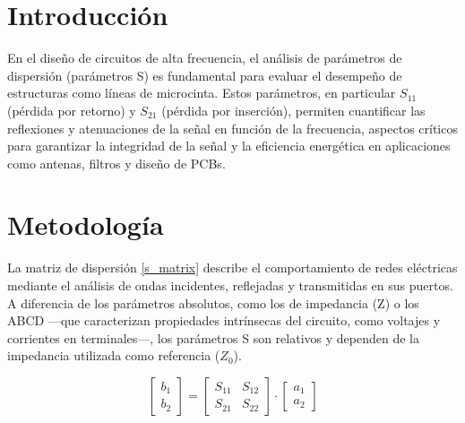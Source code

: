 \documentclass{article}   %
\theoremstyle{mytheoremstyle}
\theoremstyle{mytheoremstyle}
\theoremstyle{myproblemstyle}
\begin{document}
    \noindent\begin{minipage}{0.49\textwidth}   %
        {\centering\section*{\large Introducción}}

        En el diseño de circuitos de alta frecuencia, el análisis de parámetros de dispersión (parámetros S) es fundamental para
        evaluar el desempeño de estructuras como líneas de microcinta. Estos parámetros, en particular $S_{11}$ (pérdida por retorno)
        y $S_{21}$ (pérdida por inserción), permiten cuantificar las reflexiones y atenuaciones de la señal en función de la
        frecuencia, aspectos críticos para garantizar la integridad de la señal y la eficiencia energética en aplicaciones como
        antenas, filtros y diseño de PCBs.
        
        {\centering\section*{\large Metodología}}

        La matriz de dispersión \eqref{s_matrix} describe el comportamiento de redes eléctricas mediante el
        análisis de ondas incidentes, reflejadas y transmitidas en sus puertos. A diferencia de los parámetros absolutos, como
        los de impedancia (Z) o los ABCD —que caracterizan propiedades intrínsecas del circuito, como voltajes y corrientes en
        terminales—, los parámetros S son relativos y dependen de la impedancia utilizada
        como referencia ($Z_0$).

        \begin{equation}
            \begin{bmatrix}
                b_1\\
                b_2
            \end{bmatrix}
            =
            \begin{bmatrix}
                S_{11} & S_{12}\\
                S_{21} & S_{22}
            \end{bmatrix}
            \cdot
            \begin{bmatrix}
                a_1\\
                a_2
            \end{bmatrix}
            \label{s_matrix}
        \end{equation}


\end{minipage}
\end{document}
